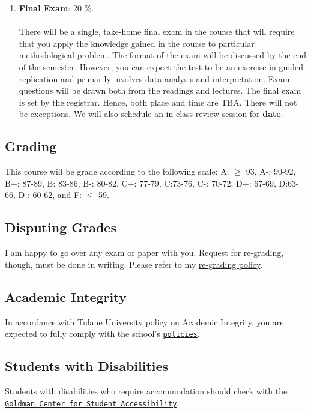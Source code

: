 \documentclass[letterpaper]{article}
\begin{document}
\begin{enumerate}
	\item {\bf Final Exam}: 20 \%. 
	\\
	\\
	There will be a single, take-home final exam in the course that will require that you apply the knowledge gained in the course to particular methodological problem. The format of the exam will be discussed by the end of the semester. However, you can expect the test to be an exercise in guided replication and primarily involves data analysis and interpretation.	Exam questions will be drawn both from the readings and lectures. The final exam is set by the registrar. Hence, both place and time are TBA. There will not be exceptions. We will also schedule an in-class review session for {\bf date}. 

\end{enumerate}




\subsection*{Grading}

This course will be grade according to the following scale: 
A: $\geq$ 93, A-: 90-92, B+: 87-89, B: 83-86, B-: 80-82, C+: 77-79, C:73-76, C-: 70-72, D+: 67-69, D:63-66, D-: 60-62, and F: $\leq$ 59. 

\subsection*{Disputing Grades}

I am happy to go over any exam or paper with you. Request for re-grading, though, must be done in writing. Please refer to my \href{https://github.com/hbahamonde/hbahamonde.github.io/raw/master/resources/ReGrade_Policy.pdf}{re-grading policy}.



\subsection*{Academic Integrity}
In accordance with Tulane University policy on Academic Integrity, you are expected to fully comply with the school's \href{https://college.tulane.edu/code-of-academic-conduct}{\texttt{policies}}. 


\subsection*{Students with Disabilities}
Students with disabilities who require accommodation should check with the \href{https://accessibility.tulane.edu/}{\texttt{Goldman Center for Student Accessibility}}.
\end{document}
